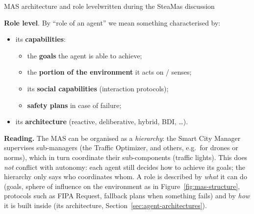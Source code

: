 \begin{nbwhiteboard}[label=wb:mas-architecture-role]{MAS architecture and role level}{written during the SteaMas discussion}
\begin{center}
\end{center}
\textbf{Role level}. By ``role of an agent'' we mean something characterised by:
\begin{itemize}[nosep]
  \item[\textbf{(A)}] its \textbf{capabilities}:
    \begin{itemize}[nosep]
      \item the \textbf{goals} the agent is able to achieve;
      \item the \textbf{portion of the environment} it acts on / senses;
      \item its \textbf{social capabilities} (interaction protocols);
      \item \textbf{safety plans} in case of failure;
    \end{itemize}
  \item[\textbf{(B)}] its \textbf{architecture} (reactive, deliberative, hybrid, BDI, \ldots).
\end{itemize}
\textbf{Reading.} The MAS can be organised as a \emph{hierarchy}: the Smart City Manager
supervises sub-managers (the Traffic Optimizer, and others, e.g.\ for drones or norms),
which in turn coordinate their sub-components (traffic lights). This does \emph{not}
conflict with autonomy: each agent still decides how to achieve its goals; the hierarchy
only says who coordinates whom. A role is described by \emph{what} it can do (goals, sphere
of influence on the environment as in Figure~\ref{fig:mas-structure}, protocols such as
FIPA Request, fallback plans when something fails) and by \emph{how} it is built inside
(its architecture, Section~\ref{sec:agent-architectures}).
\end{nbwhiteboard}

